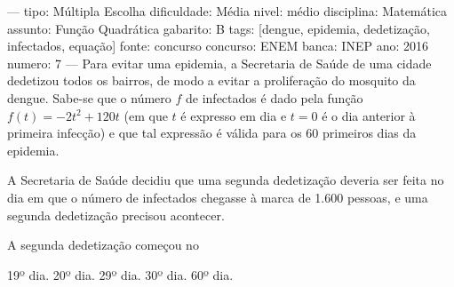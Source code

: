 ---
tipo: Múltipla Escolha
dificuldade: Média
nivel: médio
disciplina: Matemática
assunto: Função Quadrática
gabarito: B
tags: [dengue, epidemia, dedetização, infectados, equação]
fonte: concurso
concurso: ENEM
banca: INEP
ano: 2016
numero: 7
---
\question
Para evitar uma epidemia, a Secretaria de Saúde de uma cidade dedetizou todos os bairros, de modo a evitar a proliferação do mosquito da dengue. Sabe-se que o número \( f \) de infectados é dado pela função \( f(t) = -2t^2 + 120t \) (em que \( t \) é expresso em dia e \( t = 0 \) é o dia anterior à primeira infecção) e que tal expressão é válida para os 60 primeiros dias da epidemia.

A Secretaria de Saúde decidiu que uma segunda dedetização deveria ser feita no dia em que o número de infectados chegasse à marca de 1.600 pessoas, e uma segunda dedetização precisou acontecer.

A segunda dedetização começou no
\begin{oneparchoices}
\choice 19º dia.
\correctchoice 20º dia.
\choice 29º dia.
\choice 30º dia.
\choice 60º dia.
\end{oneparchoices}
